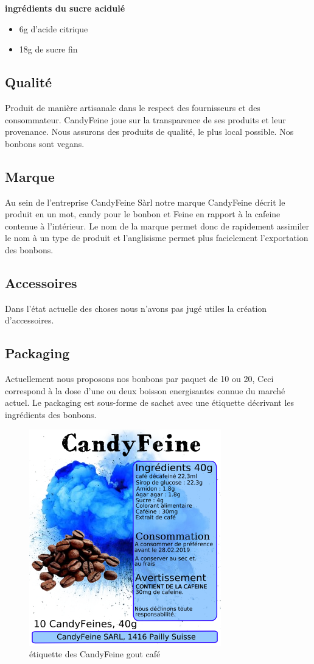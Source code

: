 \documentclass[12pt]{article}
\begin{document}
\textbf{ingrédients du sucre acidulé}
\begin{itemize}
 \item 6g d'acide citrique
 \item 18g de sucre fin
\end{itemize}

\subsection{Qualité}
Produit de manière artisanale dans le respect des fournisseurs et des consommateur.
CandyFeine joue sur la transparence de ses produits et leur provenance.
Nous assurons des produits de qualité, le plus local possible. Nos bonbons sont vegans.
\subsection{Marque}
Au sein de l'entreprise CandyFeine Sàrl notre marque CandyFeine décrit le produit en un mot, candy pour le bonbon et Feine en rapport à la cafeine contenue à l'intérieur.
Le nom de la marque permet donc de rapidement assimiler le nom à un type de produit et l'anglisisme permet plus facielement l'exportation des bonbons.

\subsection{Accessoires}
Dans l'état actuelle des choses nous n'avons pas jugé utiles la création d'accessoires.

\subsection{Packaging}
Actuellement nous proposons nos bonbons par paquet de 10 ou 20, Ceci correspond à la dose d'une ou deux boisson energisantes connue du marché actuel.
Le packaging est sous-forme de sachet avec une étiquette décrivant les ingrédients des bonbons.

\begin{figure}[H]
\centering
   \caption{\label{étiquette} étiquette des CandyFeine gout café}
   \includegraphics[scale=0.8]{../img/designEtiquettes_Cafe.png}
\end{figure}
\end{document}
